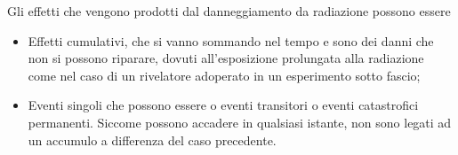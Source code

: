 Gli effetti che vengono prodotti dal danneggiamento da radiazione possono essere
\begin{itemize}[leftmargin=0.5cm]
   \item Effetti cumulativi, che si vanno sommando nel tempo e sono dei danni che non si possono riparare, dovuti all'esposizione prolungata alla radiazione come nel caso di un rivelatore adoperato in un esperimento sotto fascio;
   \item Eventi singoli che possono essere o eventi transitori o eventi catastrofici permanenti. Siccome possono accadere in qualsiasi istante, non sono legati ad un accumulo a differenza del caso precedente.
\end{itemize}


